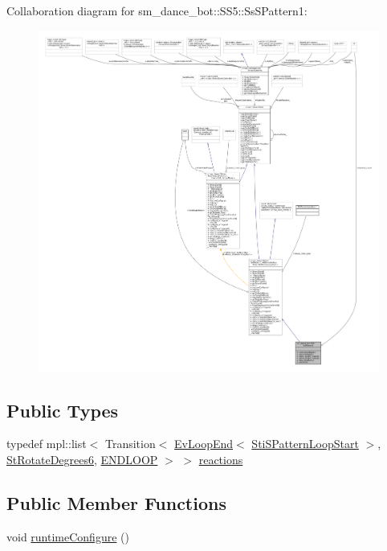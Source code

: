 Collaboration diagram for sm\+\_\+dance\+\_\+bot\+:\+:S\+S5\+:\+:Ss\+S\+Pattern1\+:
\nopagebreak
\begin{figure}[H]
\begin{center}
\leavevmode
\includegraphics[width=350pt]{structsm__dance__bot_1_1SS5_1_1SsSPattern1__coll__graph}
\end{center}
\end{figure}
\subsection*{Public Types}
\begin{DoxyCompactItemize}
\item 
typedef mpl\+::list$<$ Transition$<$ \hyperlink{structsmacc_1_1default__events_1_1EvLoopEnd}{Ev\+Loop\+End}$<$ \hyperlink{structsm__dance__bot_1_1s__pattern__states_1_1StiSPatternLoopStart}{Sti\+S\+Pattern\+Loop\+Start} $>$, \hyperlink{structsm__dance__bot_1_1StRotateDegrees6}{St\+Rotate\+Degrees6}, \hyperlink{structsmacc_1_1default__transition__tags_1_1ENDLOOP}{E\+N\+D\+L\+O\+OP} $>$ $>$ \hyperlink{structsm__dance__bot_1_1SS5_1_1SsSPattern1_a6c5b86a52543caf627a571c543f6eda8}{reactions}
\end{DoxyCompactItemize}
\subsection*{Public Member Functions}
\begin{DoxyCompactItemize}
\item 
void \hyperlink{structsm__dance__bot_1_1SS5_1_1SsSPattern1_a464b7a170494e7e6b64a43c45c7a3757}{runtime\+Configure} ()
\end{DoxyCompactItemize}
